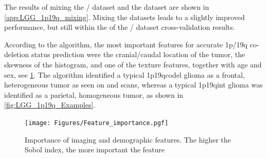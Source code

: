 The results of mixing the / dataset and the  dataset are shown in \cref{app:LGG_1p19q_mixing}.
Mixing the datasets leads to a slightly improved performance, but still within the  of the / dataset cross-validation results.

According to the algorithm, the most important features for accurate 1p/19q co-deletion status prediction were the cranial/caudal location of the \gls{tumor}, the skewness of the   histogram, and one of the texture features, together with age and sex, see \cref{fig:LGG_1p19q_feature_importance}.
The algorithm identified a typical \acl{1p19qcodel} glioma as a frontal, heterogeneous \gls{tumor} as seen on  and  scans, whereas a typical \acl{1p19qint} glioma was identified as a parietal, homogeneous \gls{tumor}, as shown in \cref{fig:LGG_1p19q_Examples}.


\begin{figure}[htbp]
\centering
\texttt{[image: Figures/Feature\_importance.pgf]}
\caption{Importance of imaging and demographic features. The higher the Sobol index, the more important the feature}\label{fig:LGG_1p19q_feature_importance}
\end{figure}


